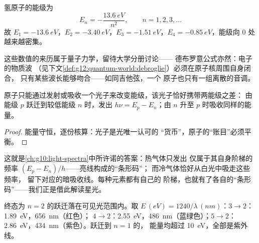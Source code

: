 \begin{proposition}[氢原子的能级阶梯]\label{prop:g12:quantum-world:hydrogen}
氢原子的能级为
\[
E_n = -\frac{\qty{13.6}{eV}}{n^2}, \qquad n = 1, 2, 3, \dots
\]
故 $E_1 = \qty{-13.6}{eV}$，$E_2 = \qty{-3.40}{eV}$，$E_3 =
\qty{-1.51}{eV}$，$E_4 = \qty{-0.85}{eV}$，能级向 $0$ 处越来越密集。
\end{proposition}
\admitted

\begin{remark}[能级阶梯的来源]\label{rem:g12:quantum-world:ladder-origin}
这些数值的来历属于量子力学，留待大学分册讨论——
德布罗意公式亦然：电子的物质波
（见下文\cref{def:g12:quantum-world:debroglie}）必须在原子核周围自身闭合，
只有某些波长能够吻合——如同吉他弦，一个
原子也只有一组离散的音调。
\end{remark}

\begin{theorem}[跃迁的光子]\label{thm:g12:quantum-world:transition}
原子只能通过发射或吸收一个光子来改变能级，该光子恰好携带两能级之差：
由能级 $p$ 跃迁到较低能级 $n$ 时，发出
$h\nu = E_p - E_n$；由 $n$ 升至 $p$ 时吸收同样的能量。
\end{theorem}

\begin{proof}
能量守恒，逐份核算：光子是光唯一认可的
“货币”，原子的“账目”必须平衡。
\end{proof}

\begin{remark}[线状光谱的解释]\label{rem:g12:quantum-world:lines}
这就是\cref{ch:g10:light-spectra}中所许诺的答案：热气体只发出
仅属于其自身阶梯的频率 $(E_p - E_n)/h$——亮线构成的“条形码”；
而冷气体恰好从白光中吸走这些频率，
留下对应的暗吸收线。每种元素都有自己的
阶梯，也就有了各自的“条形码”——我们正是借此解读星光。
\end{remark}

\begin{example}[氢原子的可见光谱线]\label{ex:g12:quantum-world:balmer}
终态为 $n = 2$ 的跃迁落在可见光范围内。取 $E \,(\unit{eV}) =
1240/\lambda\,(\unit{nm})$：$3 \to 2$：\qty{1.89}{eV}，\qty{656}{nm}（红色）；
$4 \to 2$：\qty{2.55}{eV}，\qty{486}{nm}（蓝绿色）；$5 \to 2$：
\qty{2.86}{eV}，\qty{434}{nm}（紫色）。跃迁到 $n = 1$ 的，
能量均超过 \qty{10}{eV}，全部是紫外线。
\end{example}

